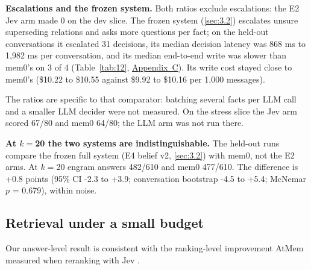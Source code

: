 \documentclass[11pt]{article}
\newcommand{\src}[1]{}
\begin{document}
\textbf{Escalations and the frozen system.} Both ratios exclude escalations: the E2 Jev arm made 0\src{bench/results/e2\_jev\_\_dev.json} on the dev slice. The frozen system (\cref{sec:3.2}) escalates unsure superseding relations and asks more questions per fact; on the held-out conversations it escalated 31\src{bench/results/e4\_belief\_v2\_\_heldout\_conv-*\_\_k3.json} decisions, its median decision latency was 868 ms\src{bench/results/heldout\_report.json} to 1,982 ms\src{bench/results/heldout\_report.json} per conversation, and its median end-to-end write was slower than mem0's on 3\src{bench/results/heldout\_report.json: conversations where engram's write p50 exceeds mem0's} of 4\src{bench/results/heldout\_report.json} (Table~\ref{tab:12}, \hyperref[app:C]{Appendix~C}). Its write cost stayed close to mem0's (\$10.22\src{bench/results/heldout\_report.json} to \$10.55\src{bench/results/heldout\_report.json} against \$9.92\src{bench/results/heldout\_report.json} to \$10.16\src{bench/results/heldout\_report.json} per 1,000 messages).

The ratios are specific to that comparator: batching several facts per LLM call and a smaller LLM decider were not measured. On the stress slice the Jev arm scored 67/80\src{bench/results/e2\_jev\_\_stress.json} and mem0 64/80\src{bench/results/mem0\_\_stress.json}; the LLM arm was not run there.

\textbf{At $k{=}$20 the two systems are indistinguishable.} The held-out runs compare the frozen full system (E4 belief v2, \cref{sec:3.2}) with mem0, not the E2 arms. At $k{=}$20 engram answers 482/610\src{bench/results/heldout\_report.json} and mem0 477/610\src{bench/results/heldout\_report.json}. The difference is +0.8\src{bench/results/heldout\_report.json} points (95\% CI -2.3\src{bench/results/heldout\_report.json} to +3.9\src{bench/results/heldout\_report.json}; conversation bootstrap -4.5\src{bench/results/heldout\_report.json} to +5.4\src{bench/results/heldout\_report.json}; McNemar $p$ = 0.679\src{bench/results/heldout\_report.json}), within noise.

\subsection{Retrieval under a small budget}\label{sec:5.2}
Our answer-level result is consistent with the ranking-level improvement AtMem measured when reranking with Jev \citep{taghia2026atmem}.
\end{document}
